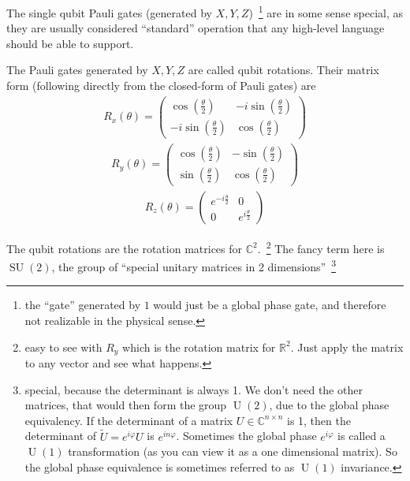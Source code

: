 The single qubit Pauli gates (generated by $X,Y,Z$)~\footnote{the ``gate'' generated by $1$ would just be a global phase gate, and therefore not realizable in the physical sense.} are in some sense special, as they are usually considered ``standard'' operation that any high-level language should be able to support.
\begin{def*}
    The Pauli gates generated by $X,Y,Z$ are called qubit rotations. Their matrix form (following directly from the closed-form of Pauli gates) are
    \begin{align}
        R_x(\theta) = \begin{pmatrix}
            \cos\left(\frac{\theta}{2}\right) & -i\sin\left(\frac{\theta}{2}\right) \\ -i\sin\left(\frac{\theta}{2}\right) & \cos\left(\frac{\theta}{2}\right)
        \end{pmatrix}
    \end{align}
    \begin{align}
        R_y(\theta) = \begin{pmatrix}
            \cos\left(\frac{\theta}{2}\right) & -\sin\left(\frac{\theta}{2}\right) \\ \sin\left(\frac{\theta}{2}\right) & \cos\left(\frac{\theta}{2}\right)
        \end{pmatrix}
    \end{align}
    \begin{align}
        R_z(\theta) = \begin{pmatrix}
            e^{-i\frac{\theta}{2}} & 0 \\ 0 & e^{i\frac{\theta}{2}}
        \end{pmatrix}
    \end{align}
\end{def*}
The qubit rotations are the rotation matrices for $\mathbb
{C}^2$.~\footnote{easy to see with $R_y$ which is the rotation matrix for $\mathbb{R}^2$. Just apply the matrix to any vector and see what happens.}
The fancy term here is $\operatorname{SU}(2)$, the group of ``special unitary matrices in 2 dimensions''~\footnote{special, because the determinant is always 1. We don't need the other matrices, that would then form the group $\operatorname{U}(2)$, due to the global phase equivalency. If the determinant of a matrix $U \in \mathbb{C}^{n \times n}$ is 1, then the determinant of $\tilde{U} = e^{i\varphi} U$ is $e^{i n \varphi}$. Sometimes the global phase $e^{i\varphi}$ is called a $\operatorname{U}(1)$ transformation (as you can view  it as a one dimensional matrix). So the global phase equivalence is sometimes referred to as $\operatorname{U}(1)$ invariance. }

